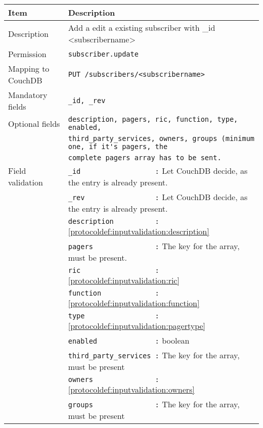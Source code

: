 \begin{table}[htbp]
  \begin{tabular}{|l|p{12cm}|} \hline
    Item               & Description  \\ \hline \hline
    Description        & Add a edit a existing subscriber with \_id <subscribername>\\ \hline
    Permission         & \verb|subscriber.update| \\ \hline
    Mapping to CouchDB & \verb|PUT /subscribers/<subscribername>|\\ \hline
    Mandatory fields   & \verb|_id, _rev| \\ \hline
    Optional fields    & \verb|description, pagers, ric, function, type, enabled,| \\
                       & \verb|third_party_services, owners, groups (minimum one, if it's pagers, the| \\
                       & \verb|complete pagers array has to be sent.| \\ \hline
    Field validation   & \verb|_id                  :| Let CouchDB decide, as the entry is already present. \\
                       & \verb|_rev                 :| Let CouchDB decide, as the entry is already present. \\
                       & \verb|description          :| \ref{protocoldef:inputvalidation:description}\\
                       & \verb|pagers               :| The key for the array, must be present.\\
                       & \verb|ric                  :| \ref{protocoldef:inputvalidation:ric} \\
                       & \verb|function             :| \ref{protocoldef:inputvalidation:function} \\
                       & \verb|type                 :| \ref{protocoldef:inputvalidation:pagertype} \\
                       & \verb|enabled              :| boolean \\
                       & \verb|third_party_services :| The key for the array, must be present \\
                       & \verb|owners               :| \ref{protocoldef:inputvalidation:owners} \\
                       & \verb|groups               :| The key for the array, must be present \\ \hline
  \end{tabular}
\end{table}

